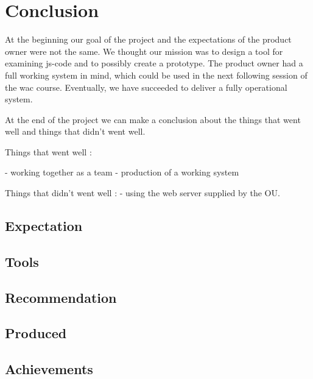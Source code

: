 
\chapter{Conclusion}

At the beginning our goal of the project and the expectations of the product
owner were not the same.
We thought our mission was to design a tool for examining \gls{js-code} and to
possibly create a prototype.
The product owner had a full working system in mind, which could be used in
the next following session of the \gls{wac} course.
Eventually, we have succeeded to deliver a fully operational system.

At the end of the project we can make a conclusion about the things that went
well and things that didn't went well.

Things that went well :

- working together as a team
- production of a working system

Things that didn't went well :
- using the web server supplied by the OU.


\section{Expectation}

\section{Tools}

\section{Recommendation}

\section{Produced}

\section{Achievements}
